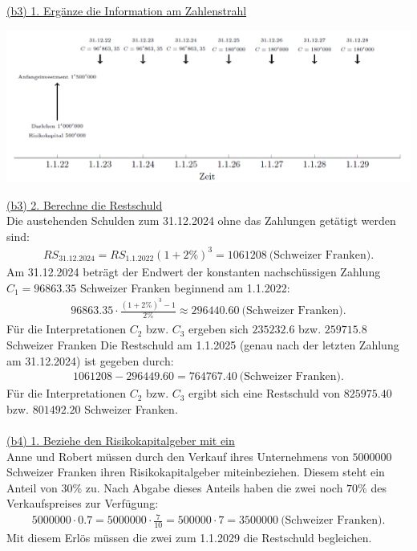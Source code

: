 \newpage
\underline{(b3) 1. Ergänze die Information am Zahlenstrahl}\\
\begin{center}
	\includegraphics[scale=0.54]{pictures/zeitstrahl_1_b_filled_3}
\end{center}
\underline{(b3) 2. Berechne die Restschuld}\\
Die austehenden Schulden zum 31.12.2024 ohne das Zahlungen  getätigt werden sind:
\begin{align*}
	RS_{\mathrm{31.12.2024}}
	=
	RS_{\mathrm{1.1.2022}}
	(1 + 2 \%)^3
	= 
	1 061 208 \ \textrm{(Schweizer Franken)}.
\end{align*} 
Am 31.12.2024 beträgt der Endwert der konstanten nachschüssigen Zahlung $C_1 = 96 863.35$ Schweizer Franken beginnend am 1.1.2022:
\begin{align*}
	96863.35 \cdot
	\frac{(1+ 2 \%)^3 - 1}{2 \%}
	\approx 
	296 440.60 \ \textrm{(Schweizer Franken)}.
\end{align*}
Für die Interpretationen $C_2 $ bzw. $C_3$ ergeben sich 
$235 232.6$ bzw. $259 715.8$ Schweizer Franken
Die Restschuld am 1.1.2025 (genau nach der letzten Zahlung am 31.12.2024) ist gegeben durch:
\begin{align*}
	1 061 208
	-
	296 449.60
	=
	764 767.40 \ \textrm{(Schweizer Franken)}.
\end{align*}
Für die Interpretationen $C_2$ bzw. $C_3$ ergibt sich eine Restschuld von $825975.40$ bzw. $801492.20$ Schweizer Franken.\\
\\
\underline{(b4) 1. Beziehe den Risikokapitalgeber mit ein}\\
Anne und Robert müssen durch den Verkauf ihres Unternehmens von $5 000 000 $ Schweizer Franken ihren Risikokapitalgeber miteinbeziehen. Diesem steht ein Anteil von $30 \%$ zu. Nach Abgabe dieses Anteils haben die zwei noch $70 \% $ des Verkaufspreises zur Verfügung:
\begin{align*}
	5 000 000 \cdot 0.7 
	= 
	5 000 000 \cdot \frac{7}{10}
	=
	5 000 00 \cdot 7 
	=
	35 000 00 \ \textrm{(Schweizer Franken)}.
\end{align*}
Mit diesem Erlös müssen die zwei zum 1.1.2029 die Restschuld begleichen.\\
\\
 
